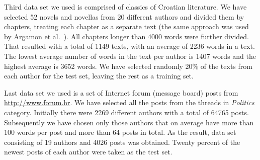 \documentclass{llncs}
\begin{document}
Third data set we used is comprised of classics of Croatian literature. We have
selected 52 novels and novellas from 20 different authors and divided them by
chapters, treating each chapter as a separate text (the same approach was used by
Argamon et al.\ \cite{argamon2005measuring}). All chapters longer than 4000 words
were further divided. That resulted with a total of 1149 texts, with an average
of 2236 words in a text. The lowest average number of words in the text per
author is 1407 words and the highest average is 3652 words. We have selected
randomly 20\% of the texts from each author for the test set, leaving the rest as
a training set.

Last data set we used is a set of Internet forum (message board)
posts from \url{http://www.forum.hr}. We have selected all the posts from the threads in
\textit{Politics} category. Initially there were 2269 different authors with a
total of 64765 posts. Subsequently we have chosen only those authors that on
average have more than 100 words per post and more than 64 posts in total. As the
result, data set consisting of 19 authors and 4026 posts was obtained. Twenty
percent of the newest posts of each author were taken as the test set.
\end{document}
